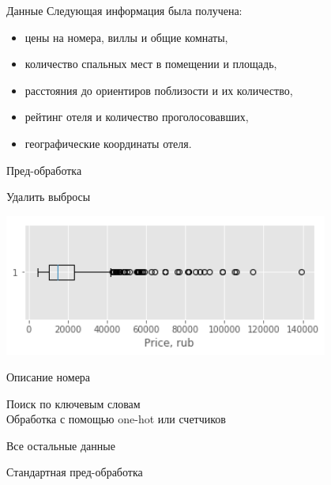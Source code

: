 \documentclass[14pt,mathserif,aspectratio=43]{beamer}
\begin{document}
\begin{frame}{Данные}
    Следующая информация была получена:
    \begin{itemize}
        \item цены на номера, виллы и общие комнаты,
        \item количество спальных мест в помещении и площадь,
        \item расстояния до ориентиров поблизости и их количество,
        \item рейтинг отеля и количество проголосовавших,
        \item географические координаты отеля.
    \end{itemize}

\end{frame}


\begin{frame}{Пред-обработка}

    \textcolor{lab-blue}{Удалить выбросы}
    
    \begin{center}
        \includegraphics[width=0.8\textwidth]{boxplot.png}
    \end{center}

    \textcolor{lab-blue}{Описание номера}
    
    Поиск по ключевым словам \\ %
    Обработка с помощью one-hot или счетчиков %

    \textcolor{lab-blue}{Все остальные данные}
    
    Стандартная пред-обработка

\end{frame}

\end{document}
